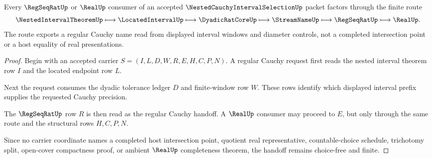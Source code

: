 \begin{theorem}
\label{thm:nested-cauchy-interval-selection-regular-cauchy-handoff}
Every $\RegSeqRatUp$ or $\RealUp$ consumer of an accepted $\NestedCauchyIntervalSelectionUp$ packet factors through the finite route
$$
\NestedIntervalTheoremUp \longmapsto \LocatedIntervalUp \longmapsto \DyadicRatCoreUp \longmapsto \StreamNameUp \longmapsto \RegSeqRatUp \longmapsto \RealUp .
$$
The route exports a regular Cauchy name read from displayed interval windows and diameter controls, not a completed intersection point or a host equality of real presentations.
\end{theorem}
\begin{proof}
Begin with an accepted carrier $S=(I,L,D,W,R,E,H,C,P,N)$. A regular Cauchy request first reads the nested interval theorem row $I$ and the located endpoint row $L$.

Next the request consumes the dyadic tolerance ledger $D$ and finite-window row $W$. These rows identify which displayed interval prefix supplies the requested Cauchy precision.

The $\RegSeqRatUp$ row $R$ is then read as the regular Cauchy handoff. A $\RealUp$ consumer may proceed to $E$, but only through the same route and the structural rows $H,C,P,N$.

Since no carrier coordinate names a completed host intersection point, quotient real representative, countable-choice schedule, trichotomy split, open-cover compactness proof, or ambient $\RealUp$ completeness theorem, the handoff remains choice-free and finite.
\end{proof}



